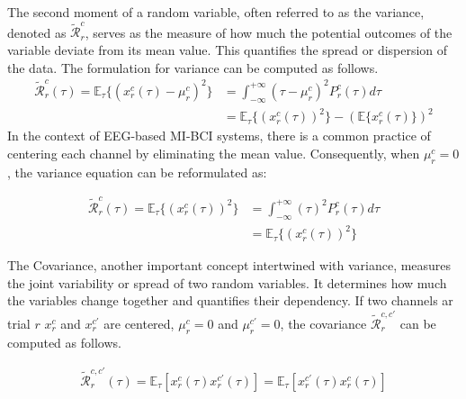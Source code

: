 \documentclass[runningheads]{llncs}
\newenvironment{reviewer}{\setcounter{pointcounter}{1}}{}
\newcommand{\changes}[1]{\textcolor[rgb]{1.00,0.00,0.00}{#1}}
\begin{document}
\begin{reviewer}
{    The second moment of a random variable, often referred to as the
    variance, denoted as \changes{$\mathcal{\tilde{R}}^{c}_{r}$},
    serves as the measure of how much the potential outcomes of the
    variable deviate from its mean value. This quantifies the spread
    or dispersion of the data. The formulation for variance can be
    computed as follows.
    \changes{
      \begin{equation}
        \begin{split}
          \mathcal{\tilde{R}}^{c}_{r}(\tau) =
          \mathbb{E}_{\tau}\{(x^{c}_{r}(\tau) - \mu^{c}_{r})^2\} &=
          \int_{-\infty}^{+\infty} \left( \tau-\mu^{c}_{r} \right) ^2
          P^{c}_{r}(\tau) d\tau \\
          &= \mathbb{E}_{\tau}\{(x^{c}_{r}(\tau))^2\} -
          (\mathbb{E}\{x^{c}_{r}(\tau)\})^2
        \end{split}
      \end{equation}
    }
    In the context of EEG-based MI-BCI systems, there is a common
    practice of centering each channel by eliminating the mean value.
    Consequently, when \changes{$\mu^{c}_{r}=0$}, the variance
    equation can be reformulated as:

    \changes{
      \begin{equation}
        \begin{split}
          \mathcal{\tilde{R}}^{c}_{r}(\tau) =
          \mathbb{E}_{\tau}\{(x^{c}_{r}(\tau))^2\} &=
          \int_{-\infty}^{+\infty}  (\tau)^2 P^{c}_{r}(\tau) d\tau \\
          &= \mathbb{E}_\tau\{(x^{c}_{r}(\tau))^2\}
        \end{split}
      \end{equation}
    }

    The Covariance, another important concept intertwined with
    variance, measures the joint variability or spread of two random
    variables. It determines how much the variables change together
    and quantifies their dependency. \changes{If two channels ar
      trial $r$ $x^{c}_{r}$ and $x^{c'}_{r}$ are centered,
      $\mu^{c}_{r}=0$ and $\mu^{c'}_{r}=0$, the covariance
    $\mathcal{\tilde{R}}^{c, c'}_{r}$} can be computed as follows.

    \changes{
      \begin{equation}
        \begin{split}
          \mathcal{\tilde{R}}^{c, c'}_{r}(\tau) = \mathbb{E}_{\tau}
          \left[ x^{c}_{r}(\tau) x^{c'}_{r}(\tau)  \right] =
          \mathbb{E}_{\tau} \left[ x^{c'}_{r}(\tau) x^{c}_{r}(\tau) \right]
        \end{split}
      \end{equation}
    }

}
\end{reviewer}
\end{document}
